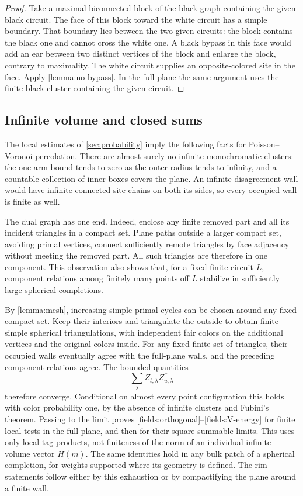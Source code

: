 \begin{proof}
Take a maximal biconnected block of the black graph containing the given
black circuit.  The face of this block toward the white circuit has a
simple boundary.  That boundary lies between the two given circuits:
the block contains the black one and cannot cross the white one.  A black
bypass in this face would add an ear between two distinct vertices of the
block and enlarge the block, contrary to maximality.  The white circuit
supplies an opposite-colored site in the face.  Apply
\cref{lemma:no-bypass}.  In the full plane the same argument uses the finite
black cluster containing the given circuit.
\end{proof}

\subsection{Infinite volume and closed sums}

The local estimates of \cref{sec:probability} imply the following facts
for Poisson--Voronoi percolation.  There are almost surely no infinite
monochromatic clusters: the one-arm bound tends to zero as the outer
radius tends to infinity, and a countable collection of inner boxes covers
the plane.  An infinite disagreement wall would have infinite connected
site chains on both its sides, so every occupied wall is finite as well.

The dual graph has one end.  Indeed, enclose any finite removed part and
all its incident triangles in a compact set.  Plane paths outside a larger
compact set, avoiding primal vertices, connect sufficiently remote
triangles by face adjacency without meeting the removed part.  All such
triangles are therefore in one component.  This observation also shows
that, for a fixed finite circuit $L$, component relations among finitely
many points off $L$ stabilize in sufficiently large spherical completions.

By \cref{lemma:mesh}, increasing simple primal cycles can be chosen around
any fixed compact set.  Keep their interiors and triangulate the outside
to obtain finite simple spherical triangulations, with independent fair
colors on the additional vertices and the original colors inside.  For
any fixed finite set of triangles, their occupied walls eventually agree
with the full-plane walls, and the preceding component relations agree.
The bounded quantities
\[
 \sum_\lambda Z_{t,\lambda}\overline{Z_{u,\lambda}}
\]
therefore converge.  Conditional on almost every point configuration this
holds with color probability one, by the absence of infinite clusters and
Fubini's theorem.  Passing to the limit proves
\eqref{fields:orthogonal}--\eqref{fields:V-energy} for finite local tests
in the full plane, and then for their square-summable limits.  This uses
only local tag products, not finiteness of the norm of an individual
infinite-volume vector $H(m)$.  The same identities hold in any bulk patch
of a spherical completion, for weights supported where its geometry is
defined.  The rim statements follow either by this exhaustion or by
compactifying the plane around a finite wall.

